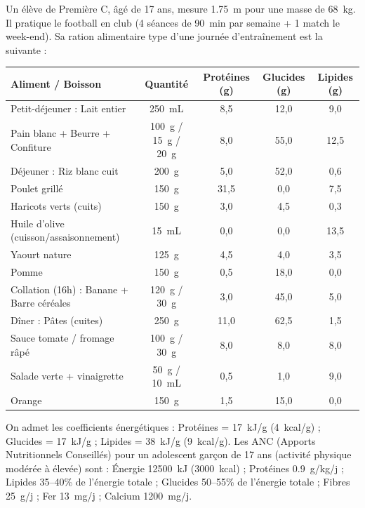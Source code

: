 \documentclass[11pt]{article}
\begin{document}
\begin{exercice}
Un élève de Première C, âgé de 17 ans, mesure \SI{1,75}{m} pour une masse de \SI{68}{kg}. Il pratique le football en club (4 séances de \SI{90}{min} par semaine + 1 match le week-end). Sa ration alimentaire type d'une journée d'entraînement est la suivante :

\begin{center}
\begin{tabularx}{\linewidth}{>{\raggedright\arraybackslash}X c c c c}
\toprule
\textbf{Aliment / Boisson} & \textbf{Quantité} & \textbf{Protéines (g)} & \textbf{Glucides (g)} & \textbf{Lipides (g)} \\
\midrule
Petit-déjeuner : Lait entier & \SI{250}{mL} & 8,5 & 12,0 & 9,0 \\
Pain blanc + Beurre + Confiture & \SI{100}{g} / \SI{15}{g} / \SI{20}{g} & 8,0 & 55,0 & 12,5 \\
Déjeuner : Riz blanc cuit & \SI{200}{g} & 5,0 & 52,0 & 0,6 \\
Poulet grillé & \SI{150}{g} & 31,5 & 0,0 & 7,5 \\
Haricots verts (cuits) & \SI{150}{g} & 3,0 & 4,5 & 0,3 \\
Huile d'olive (cuisson/assaisonnement) & \SI{15}{mL} & 0,0 & 0,0 & 13,5 \\
Yaourt nature & \SI{125}{g} & 4,5 & 4,0 & 3,5 \\
Pomme & \SI{150}{g} & 0,5 & 18,0 & 0,0 \\
Collation (16h) : Banane + Barre céréales & \SI{120}{g} / \SI{30}{g} & 3,0 & 45,0 & 5,0 \\
Dîner : Pâtes (cuites) & \SI{250}{g} & 11,0 & 62,5 & 1,5 \\
Sauce tomate / fromage râpé & \SI{100}{g} / \SI{30}{g} & 8,0 & 8,0 & 8,0 \\
Salade verte + vinaigrette & \SI{50}{g} / \SI{10}{mL} & 0,5 & 1,0 & 9,0 \\
Orange & \SI{150}{g} & 1,5 & 15,0 & 0,0 \\
\bottomrule
\end{tabularx}
\end{center}

\noindent On admet les coefficients énergétiques : Protéines = \SI{17}{kJ/g} (\SI{4}{kcal/g}) ; Glucides = \SI{17}{kJ/g} ; Lipides = \SI{38}{kJ/g} (\SI{9}{kcal/g}). Les ANC (Apports Nutritionnels Conseillés) pour un adolescent garçon de 17 ans (activité physique modérée à élevée) sont : Énergie \SI{12500}{kJ} (\SI{3000}{kcal}) ; Protéines \SI{0,9}{g/kg/j} ; Lipides 35--40\% de l'énergie totale ; Glucides 50--55\% de l'énergie totale ; Fibres \SI{25}{g/j} ; Fer \SI{13}{mg/j} ; Calcium \SI{1200}{mg/j}.


\end{exercice}
\end{document}
